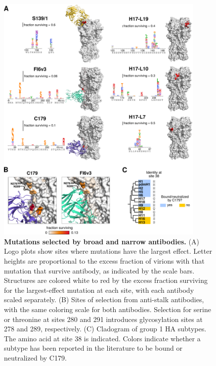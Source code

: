 \documentclass[11pt]{article}
\begin{document}
\begin{figure}[h!]
\centerline{\includegraphics[width=0.9\textwidth]{Fig5.pdf}}
\caption{
\label{fig:structures}
{\bf Mutations selected by broad and narrow antibodies.}
(A) Logo plots show sites where mutations have the largest effect.
Letter heights are proportional to the excess fraction of virions with that mutation that survive antibody, as indicated by the scale bars.
Structures are colored white to red by the excess fraction surviving for the largest-effect mutation at each site, with each antibody scaled separately.  
(B) Sites of selection from anti-stalk antibodies, with the same coloring scale for both antibodies. Selection for serine or threonine at sites 280 and 291 introduces glycosylation sites at 278 and 289, respectively.
(C) Cladogram of group 1 HA subtypes.
The amino acid at site 38 is indicated. 
Colors indicate whether a subtype has been reported in the literature to be bound or neutralized by C179.  
}
\end{figure}

\clearpage
\end{document}
